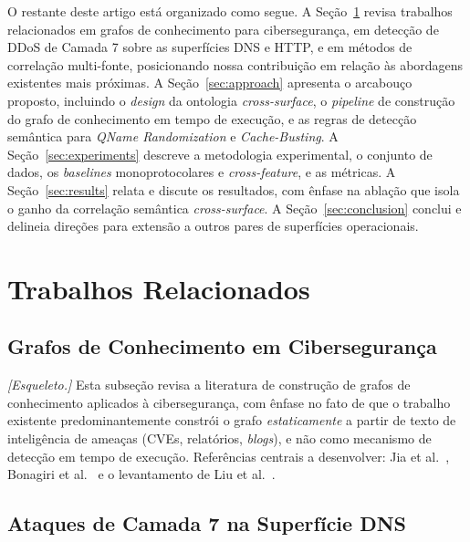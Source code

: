 \documentclass[preprint,12pt]{elsarticle}
\begin{document}
O restante deste artigo está organizado como segue. A Seção~\ref{sec:related} revisa trabalhos relacionados em grafos de conhecimento para cibersegurança, em detecção de DDoS de Camada 7 sobre as superfícies DNS e HTTP, e em métodos de correlação multi-fonte, posicionando nossa contribuição em relação às abordagens existentes mais próximas. A Seção~\ref{sec:approach} apresenta o arcabouço proposto, incluindo o \emph{design} da ontologia \emph{cross-surface}, o \emph{pipeline} de construção do grafo de conhecimento em tempo de execução, e as regras de detecção semântica para \emph{QName Randomization} e \emph{Cache-Busting}. A Seção~\ref{sec:experiments} descreve a metodologia experimental, o conjunto de dados, os \emph{baselines} monoprotocolares e \emph{cross-feature}, e as métricas. A Seção~\ref{sec:results} relata e discute os resultados, com ênfase na ablação que isola o ganho da correlação semântica \emph{cross-surface}. A Seção~\ref{sec:conclusion} conclui e delineia direções para extensão a outros pares de superfícies operacionais.


\section{Trabalhos Relacionados}
\label{sec:related}

\subsection{Grafos de Conhecimento em Cibersegurança}

\textit{[Esqueleto.]} Esta subseção revisa a literatura de construção de grafos de conhecimento aplicados à cibersegurança, com ênfase no fato de que o trabalho existente predominantemente constrói o grafo \emph{estaticamente} a partir de texto de inteligência de ameaças (CVEs, relatórios, \emph{blogs}), e não como mecanismo de detecção em tempo de execução. Referências centrais a desenvolver: Jia et al.~\cite{jia2018practical}, Bonagiri et al.~\cite{bonagiri2024practical} e o levantamento de Liu et al.~\cite{liu2022recent}.

\subsection{Ataques de Camada 7 na Superfície DNS}
\end{document}
